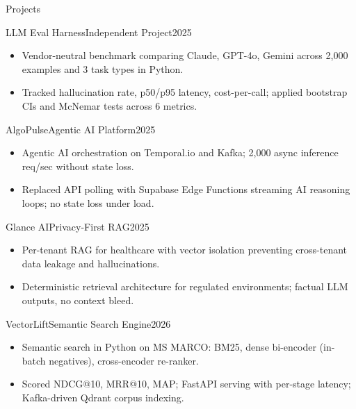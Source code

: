 \documentclass[]{mcdowellcv}
\begin{document}
\begin{cvsection}{Projects}
  \begin{cvsubsection}{LLM Eval Harness}{Independent Project}{2025}
    \begin{itemize}
      \item Vendor-neutral benchmark comparing Claude, GPT-4o, Gemini across 2,000 examples and 3 task types in Python.
      \item Tracked hallucination rate, p50/p95 latency, cost-per-call; applied bootstrap CIs and McNemar tests across 6 metrics.
    \end{itemize}
    \vspace{-1.5pt}
  \end{cvsubsection}

  \begin{cvsubsection}{AlgoPulse}{Agentic AI Platform}{2025}
    \begin{itemize}
      \item Agentic AI orchestration on Temporal.io and Kafka; 2,000 async inference req/sec without state loss.
      \item Replaced API polling with Supabase Edge Functions streaming AI reasoning loops; no state loss under load.
    \end{itemize}
    \vspace{-1.5pt}
  \end{cvsubsection}

  \begin{cvsubsection}{Glance AI}{Privacy-First RAG}{2025}
    \begin{itemize}
      \item Per-tenant RAG for healthcare with vector isolation preventing cross-tenant data leakage and hallucinations.
      \item Deterministic retrieval architecture for regulated environments; factual LLM outputs, no context bleed.
    \end{itemize}
    \vspace{-1.5pt}
  \end{cvsubsection}

  \begin{cvsubsection}{VectorLift}{Semantic Search Engine}{2026}
    \begin{itemize}
      \item Semantic search in Python on MS MARCO: BM25, dense bi-encoder (in-batch negatives), cross-encoder re-ranker.
      \item Scored NDCG@10, MRR@10, MAP; FastAPI serving with per-stage latency; Kafka-driven Qdrant corpus indexing.
    \end{itemize}
  \end{cvsubsection}
\end{cvsection}
\end{document}
